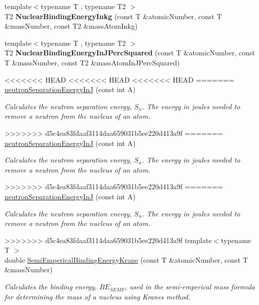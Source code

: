 \begin{DoxyCompactItemize}
\item 
{\footnotesize template$<$typename T , typename T2 $>$ }\\T2 {\bfseries Nuclear\+Binding\+Energy\+Inkg} (const T \&atomic\+Number, const T \&mass\+Number, const T2 \&mass\+Atom\+Inkg)
\item 
{\footnotesize template$<$typename T , typename T2 $>$ }\\T2 {\bfseries Nuclear\+Binding\+Energy\+In\+J\+Perc\+Squared} (const T \&atomic\+Number, const T \&mass\+Number, const T2 \&mass\+Atom\+In\+J\+Perc\+Squared)
\item 
<<<<<<< HEAD
<<<<<<< HEAD
<<<<<<< HEAD
=======
\hyperlink{group___nuclear_separation_energy_ga2a5d74c0ab6645fa7860541e826897b6}{neutron\+Separation\+Energy\+InJ} (const int A)
\begin{DoxyCompactList}\small\item\em Calculates the neutron separation energy, $S_{n}$. The energy in joules needed to remove a neutron from the nucleus of an atom. \end{DoxyCompactList}\item 
>>>>>>> d5c4ea83fdaaf3114daa659031b5ee220d413a9f
=======
\hyperlink{group___nuclear_separation_energy_ga2a5d74c0ab6645fa7860541e826897b6}{neutron\+Separation\+Energy\+InJ} (const int A)
\begin{DoxyCompactList}\small\item\em Calculates the neutron separation energy, $S_{n}$. The energy in joules needed to remove a neutron from the nucleus of an atom. \end{DoxyCompactList}\item 
>>>>>>> d5c4ea83fdaaf3114daa659031b5ee220d413a9f
=======
\hyperlink{group___nuclear_separation_energy_ga2a5d74c0ab6645fa7860541e826897b6}{neutron\+Separation\+Energy\+InJ} (const int A)
\begin{DoxyCompactList}\small\item\em Calculates the neutron separation energy, $S_{n}$. The energy in joules needed to remove a neutron from the nucleus of an atom. \end{DoxyCompactList}\item 
>>>>>>> d5c4ea83fdaaf3114daa659031b5ee220d413a9f
{\footnotesize template$<$typename T $>$ }\\double \hyperlink{group___semi_empirical_mass_formula_ga99c5a87be2c76d3fa4852654c3fd59a9}{Semi\+Emperical\+Binding\+Energy\+Krane} (const T \&atomic\+Number, const T \&mass\+Number)
\begin{DoxyCompactList}\small\item\em Calculates the binding energy, $BE_{SEMF}$, used in the semi-\/emperical mass formula for determining the mass of a nucleus using Krane\textquotesingle{}s method. \end{DoxyCompactList}\item 

\end{DoxyCompactItemize}
